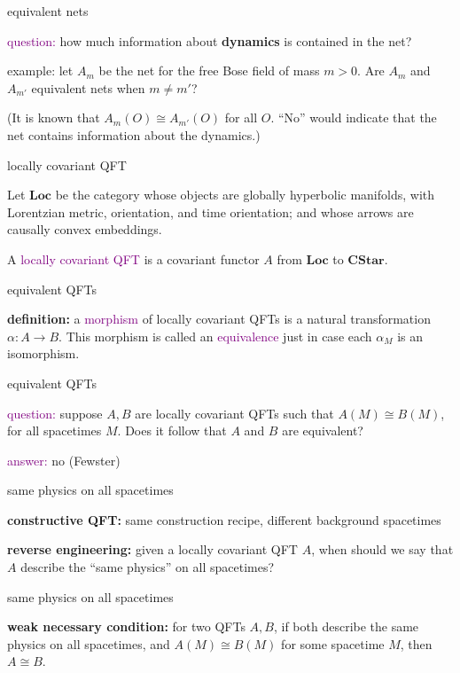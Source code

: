 \documentclass{beamer}
\begin{document}
\begin{frame}{equivalent nets}

  \textcolor{purple}{question:} how much information about
  \textbf{dynamics} is contained in the net?

  \bigskip example: let $A_m$ be the net for the free Bose field of
  mass $m>0$.  Are $A_m$ and $A_{m'}$ equivalent nets when $m\neq m'$?

  \bigskip (It is known that $A_m(O)\cong A_{m'}(O)$ for all $O$.
  ``No'' would indicate that the net contains information about the
  dynamics.)


\end{frame}

\begin{frame}{locally covariant QFT}


  Let $\mathbf{Loc}$ be the category whose objects are globally
  hyperbolic manifolds, with Lorentzian metric, orientation, and time
  orientation; and whose arrows are causally convex embeddings.

  \bigskip A \textcolor{purple}{locally covariant QFT} is a covariant
  functor $A$ from $\mathbf{Loc}$ to $\mathbf{CStar}$.



\end{frame}


\begin{frame}{equivalent QFTs}

  \textbf{definition:} a \textcolor{purple}{morphism} of locally
  covariant QFTs is a natural transformation $\alpha :A\to B$.  This
  morphism is called an \textcolor{purple}{equivalence} just in case
  each $\alpha _M$ is an isomorphism.

\end{frame}


\begin{frame}{equivalent QFTs}

  \textcolor{purple}{question:} suppose $A,B$ are locally covariant
  QFTs such that $A(M)\cong B(M)$, for all spacetimes $M$.  Does it
  follow that $A$ and $B$ are equivalent?

  \bigskip \textcolor{purple}{answer:} no (Fewster)




\end{frame}


\begin{frame}{same physics on all spacetimes}

  \textbf{constructive QFT:} same construction recipe, different
  background spacetimes

  \bigskip \textbf{reverse engineering:} given a locally covariant QFT
  $A$, when should we say that $A$ describe the ``same physics'' on
  all spacetimes?





\end{frame}


\begin{frame}{same physics on all spacetimes}

  \textbf{weak necessary condition:} for two QFTs $A,B$, if both
  describe the same physics on all spacetimes, and $A(M)\cong B(M)$
  for some spacetime $M$, then $A\cong B$.


\end{frame}
\end{document}
